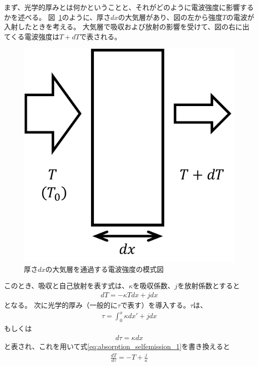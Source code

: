まず、光学的厚みとは何かということと、それがどのように電波強度に影響するかを述べる。
図~\ref{fig:depth_dx}のように、厚さ$dx$の大気層があり、図の左から強度$T$の電波が入射したときを考える。
大気層で吸収および放射の影響を受けて、図の右に出てくる電波強度は$T+dT$で表される。
\begin{figure}[htbp]
    \centering
    \includegraphics{master_thesis_contents/master_thesis_fig/depth_dx.pdf}
    \caption{厚さ$dx$の大気層を通過する電波強度の模式図}
    \label{fig:depth_dx}
\end{figure}
このとき、吸収と自己放射を表す式は、$\kappa$を吸収係数、$j$を放射係数とすると
\begin{gather}
    dT = -\kappa T dx + j dx
    \label{eq:absorption_selfemission_1}
\end{gather}
となる。
次に光学的厚み（一般的に$\tau$で表す）を導入する。$\tau$は、
\begin{gather}
    \tau = \int_{0}^{x} \kappa dx' + j dx
\end{gather}
もしくは
\begin{gather}
    d\tau = \kappa dx
\end{gather}
と表され、これを用いて式\eqref{eq:absorption_selfemission_1}を書き換えると
\begin{gather}
    \frac{dT}{d\tau} = -T + \frac{j}{\kappa}
    \label{eq:absorption_selfemission_4}
\end{gather}
